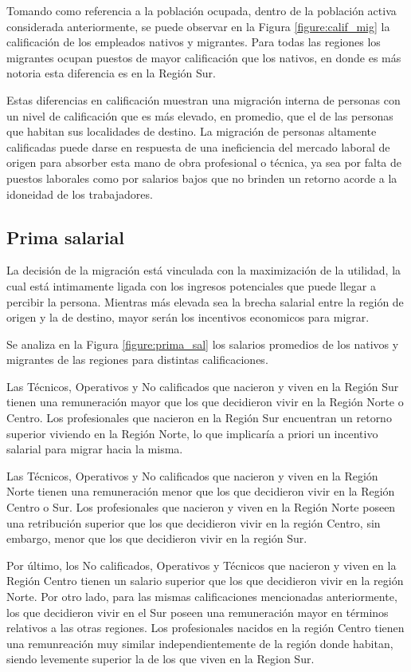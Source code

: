 \documentclass[12pt,a4paper]{article}
\begin{document}
Tomando como referencia a la población ocupada, dentro de la población activa considerada anteriormente, se puede observar en la Figura \ref{figure:calif_mig} la calificación de los empleados nativos y migrantes. Para todas las regiones los migrantes ocupan puestos de mayor calificación que los nativos, en donde es más notoria esta diferencia es en la Región Sur.

Estas diferencias en calificación muestran una migración interna de personas con un nivel de calificación que es más elevado, en promedio, que el de las personas que habitan sus localidades de destino. La migración de personas altamente calificadas puede darse en respuesta de una ineficiencia del mercado laboral de origen para absorber esta mano de obra profesional o técnica, ya sea por falta de puestos laborales como por salarios bajos que no brinden un retorno acorde a la idoneidad de los trabajadores.

\subsection{Prima salarial}
La decisión de la migración está vinculada con la maximización de la utilidad, la cual está intimamente ligada con los ingresos potenciales que puede llegar a percibir la persona. Mientras más elevada sea la brecha salarial entre la región de origen y la de destino, mayor serán los incentivos economicos para migrar.

Se analiza en la Figura \ref{figure:prima_sal} los salarios promedios de los nativos y migrantes de las regiones para distintas calificaciones. 

Las Técnicos, Operativos y No calificados que nacieron y viven en la Región Sur tienen una remuneración mayor que los que decidieron vivir en la Región Norte o Centro. Los profesionales que nacieron en la Región Sur encuentran un retorno superior viviendo en la Región Norte, lo que implicaría a priori un incentivo salarial para migrar hacia la misma.

Las Técnicos, Operativos y No calificados que nacieron y viven en la Región Norte tienen una remuneración menor que los que decidieron vivir en la Región Centro o Sur. Los profesionales que nacieron y viven en la Región Norte poseen una retribución superior que los que decidieron vivir en la región Centro, sin embargo, menor que los que decidieron vivir en la región Sur.

Por último, los No calificados, Operativos y Técnicos que nacieron y viven en la Región Centro tienen un salario superior que los que decidieron vivir en la región Norte. Por otro lado, para las mismas calificaciones mencionadas anteriormente, los que decidieron vivir en el Sur poseen una remuneración mayor en términos relativos a las otras regiones. Los profesionales nacidos en la región Centro tienen una remunreación muy similar independientemente de la región donde habitan, siendo levemente superior la de los que viven en la Region Sur.
\end{document}
